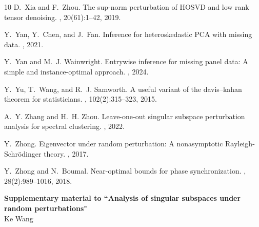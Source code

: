 \documentclass[reqno]{amsart}
\theoremstyle{plain}
\theoremstyle{definition}
\begin{document}
\begin{thebibliography}{10}
D.~Xia and F.~Zhou.
\newblock The sup-norm perturbation of {HOSVD} and low rank tensor denoising.
, 20(61):1--42, 2019.

Y.~Yan, Y.~Chen, and J.~Fan.
\newblock Inference for heteroskedastic {PCA} with missing data.
, 2021.

Y.~Yan and M.~J. Wainwright.
\newblock Entrywise inference for missing panel data: A simple and
  instance-optimal approach.
, 2024.

Y.~Yu, T.~Wang, and R.~J. Samworth.
\newblock A useful variant of the davis--kahan theorem for statisticians.
, 102(2):315--323, 2015.

A.~Y. Zhang and H.~H. Zhou.
\newblock Leave-one-out singular subspace perturbation analysis for spectral
  clustering.
, 2022.

Y.~Zhong.
\newblock Eigenvector under random perturbation: A nonasymptotic
  {R}ayleigh-{S}chr{\"o}dinger theory.
, 2017.

Y.~Zhong and N.~Boumal.
\newblock Near-optimal bounds for phase synchronization.
, 28(2):989--1016, 2018.

\end{thebibliography}


\newpage
\appendix

\begin{center}
    {\huge \textbf{Supplementary material to ``Analysis of singular subspaces under random perturbations"}} \\[0.5cm]
    {\large Ke Wang}
\end{center}

\end{document}
